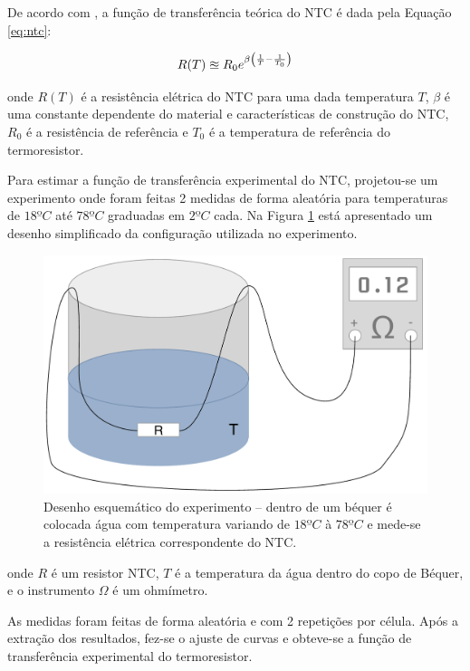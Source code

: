 \documentclass[a4paper]{instrumentacao}
\begin{document}
De acordo com , a função de transferência teórica do NTC é dada pela Equação \ref{eq:ntc}:

\begin{equation}
	\large
	R(T) \approxeq R_0 e^{\beta\left(\frac{1}{T} - \frac{1}{T_0}\right)}
	\label{eq:ntc}
\end{equation}

\noindent
onde $R(T)$ é a resistência elétrica do NTC para uma dada temperatura $T$, $\beta$ é uma constante dependente do material e características de construção do NTC, $R_0$ é a resistência de referência e $T_0$ é a temperatura de referência do termoresistor.

Para estimar a função de transferência experimental do NTC, projetou-se um experimento onde foram feitas 2 medidas de forma aleatória para temperaturas de $18ºC$ até $78ºC$ graduadas em $2ºC$ cada. Na Figura \ref{fig:ntc-esquematico} está apresentado um desenho simplificado da configuração utilizada no experimento.

\begin{figure}[H]
\center
\includegraphics[width=\textwidth]{Bequer.pdf}
\caption{Desenho esquemático do experimento -- dentro de um béquer é colocada água com temperatura variando de $18ºC$ à $78ºC$ e mede-se a resistência elétrica correspondente do NTC.}
\label{fig:ntc-esquematico}
\end{figure}

\noindent
onde $R$ é um resistor NTC, $T$ é a temperatura da água dentro do copo de Béquer, e o instrumento $\Omega$ é um ohmímetro.

As medidas foram feitas de forma aleatória e com 2 repetições por célula. Após a extração dos resultados, fez-se o ajuste de curvas e obteve-se a função de transferência experimental do termoresistor.
\end{document}
